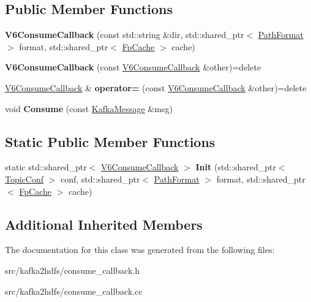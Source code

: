 \subsection*{Public Member Functions}
\begin{DoxyCompactItemize}
\item 
{\bfseries V6\+Consume\+Callback} (const std\+::string \&dir, std\+::shared\+\_\+ptr$<$ \hyperlink{classlog2hdfs_1_1PathFormat}{Path\+Format} $>$ format, std\+::shared\+\_\+ptr$<$ \hyperlink{classlog2hdfs_1_1FpCache}{Fp\+Cache} $>$ cache)\hypertarget{classlog2hdfs_1_1V6ConsumeCallback_a0318d8c237826367abfd58c4072095e5}{}\label{classlog2hdfs_1_1V6ConsumeCallback_a0318d8c237826367abfd58c4072095e5}

\item 
{\bfseries V6\+Consume\+Callback} (const \hyperlink{classlog2hdfs_1_1V6ConsumeCallback}{V6\+Consume\+Callback} \&other)=delete\hypertarget{classlog2hdfs_1_1V6ConsumeCallback_a1c2ee59c8f51913a55a76187b69ae911}{}\label{classlog2hdfs_1_1V6ConsumeCallback_a1c2ee59c8f51913a55a76187b69ae911}

\item 
\hyperlink{classlog2hdfs_1_1V6ConsumeCallback}{V6\+Consume\+Callback} \& {\bfseries operator=} (const \hyperlink{classlog2hdfs_1_1V6ConsumeCallback}{V6\+Consume\+Callback} \&other)=delete\hypertarget{classlog2hdfs_1_1V6ConsumeCallback_a19c034ceeb896fe2c93ab289e335f8b6}{}\label{classlog2hdfs_1_1V6ConsumeCallback_a19c034ceeb896fe2c93ab289e335f8b6}

\item 
void {\bfseries Consume} (const \hyperlink{classlog2hdfs_1_1KafkaMessage}{Kafka\+Message} \&msg)\hypertarget{classlog2hdfs_1_1V6ConsumeCallback_a0eaef4b1a9d52ccff835e0a18f40dd51}{}\label{classlog2hdfs_1_1V6ConsumeCallback_a0eaef4b1a9d52ccff835e0a18f40dd51}

\end{DoxyCompactItemize}
\subsection*{Static Public Member Functions}
\begin{DoxyCompactItemize}
\item 
static std\+::shared\+\_\+ptr$<$ \hyperlink{classlog2hdfs_1_1V6ConsumeCallback}{V6\+Consume\+Callback} $>$ {\bfseries Init} (std\+::shared\+\_\+ptr$<$ \hyperlink{classlog2hdfs_1_1TopicConf}{Topic\+Conf} $>$ conf, std\+::shared\+\_\+ptr$<$ \hyperlink{classlog2hdfs_1_1PathFormat}{Path\+Format} $>$ format, std\+::shared\+\_\+ptr$<$ \hyperlink{classlog2hdfs_1_1FpCache}{Fp\+Cache} $>$ cache)\hypertarget{classlog2hdfs_1_1V6ConsumeCallback_ad7e83f4b00d16a683bc3f85202b2e3b4}{}\label{classlog2hdfs_1_1V6ConsumeCallback_ad7e83f4b00d16a683bc3f85202b2e3b4}

\end{DoxyCompactItemize}
\subsection*{Additional Inherited Members}


The documentation for this class was generated from the following files\+:\begin{DoxyCompactItemize}
\item 
src/kafka2hdfs/consume\+\_\+callback.\+h\item 
src/kafka2hdfs/consume\+\_\+callback.\+cc\end{DoxyCompactItemize}
